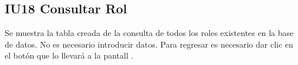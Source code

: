 \newpage
\subsection{IU18 Consultar Rol}
		Se muestra la tabla creada de la consulta de todos los roles existentes en la base de datos. No es necesario introducir datos.
		Para regresar es necesario dar clic en el botón  que lo llevará a la pantall .
